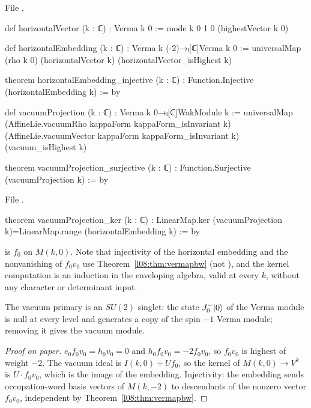 \noindent File .
\begin{leancode}
def horizontalVector (k : ℂ) : Verma k 0 := mode k 0 1 0 (highestVector k 0)

def horizontalEmbedding (k : ℂ) : Verma k (-2)→ₗ[ℂ]Verma k 0 :=
  universalMap (rho k 0) (horizontalVector k) (horizontalVector_isHighest k)

theorem horizontalEmbedding_injective (k : ℂ) : Function.Injective (horizontalEmbedding k) := by

def vacuumProjection (k : ℂ) : Verma k 0→ₗ[ℂ]WakModule k :=
  universalMap (AffineLie.vacuumRho kappaForm kappaForm_isInvariant k)
    (AffineLie.vacuumVector kappaForm kappaForm_isInvariant k) (vacuum_isHighest k)

theorem vacuumProjection_surjective (k : ℂ) : Function.Surjective (vacuumProjection k) := by
\end{leancode}
\noindent File .
\begin{leancode}
theorem vacuumProjection_ker (k : ℂ) :
    LinearMap.ker (vacuumProjection k)=LinearMap.range (horizontalEmbedding k) := by
\end{leancode}

\begin{dictionary}
 is $f_0$ on $M(k,0)$. Note that injectivity of the horizontal embedding and the
nonvanishing of $f_0v_0$ use Theorem~\ref{l08:thm:vermapbw} (not ), and the kernel computation
is an induction in the enveloping algebra, valid at every $k$, without any character or determinant
input.
\end{dictionary}

\begin{physics}
The vacuum primary is an $SU(2)$ singlet: the state $J^-_0|0\rangle$ of the Verma module is null at every
level and generates a copy of the spin $-1$ Verma module; removing it gives the vacuum module.
\end{physics}

\begin{proof}[Proof on paper]
$e_0f_0v_0 = h_0v_0 = 0$ and $h_0f_0v_0 = -2f_0v_0$, so $f_0v_0$ is highest of weight $-2$. The vacuum
ideal is $I(k,0) + U f_0$, so the kernel of $M(k,0)\to V^k$ is $U\cdot f_0v_0$, which is the image of the
embedding. Injectivity: the embedding sends occupation-word basis vectors of $M(k,-2)$ to
descendants of the nonzero vector $f_0v_0$, independent by Theorem~\ref{l08:thm:vermapbw}.
\end{proof}

